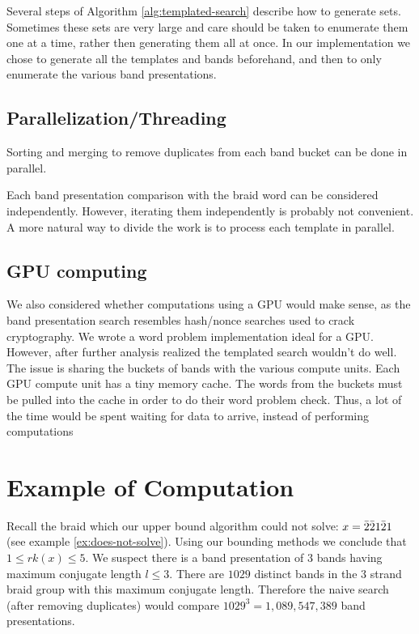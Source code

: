 \documentclass[12pt]{thesis}
\begin{document}
Several steps of Algorithm \ref{alg:templated-search} describe how to generate sets. 
Sometimes these sets are very large and care should be
taken to enumerate them one at a time, rather then generating them all at once.
In our implementation we chose to 
generate all the templates and bands beforehand,
and then to only enumerate the various band presentations.

\subsection{Parallelization/Threading}

Sorting and merging to remove duplicates from each band
bucket can be done in parallel.

Each band presentation comparison with the braid word
can be considered independently.
However, iterating them independently is probably not convenient.
A more natural way to divide the work is to process
each template in parallel.

\subsection{GPU computing}

We also considered whether computations using a GPU would make sense,
as the band presentation search resembles hash/nonce searches used to crack cryptography.
We wrote a word problem implementation ideal for a GPU.
However, after further analysis realized the templated search wouldn't do well. 
The issue is sharing the buckets of bands with the various compute units.
Each GPU compute unit has a tiny memory cache.
The words from the buckets must be pulled into the cache in order to do their word problem check.
Thus, a lot of the time would be spent waiting for data to arrive, instead of 
performing computations

\section{Example of Computation}

Recall the braid which our upper bound algorithm
could not solve: $x = \bar{2} \bar{2} 1 \bar{2} 1$ (see example \ref{ex:does-not-solve}).
Using our bounding methods we conclude that $1 \leq rk(x) \leq 5$.
We suspect there is a band presentation of $3$ bands having maximum conjugate length $l \leq 3$.
There are $1029$  distinct bands in the $3$ strand braid group with this maximum conjugate length.
Therefore the naive search (after removing duplicates)
would compare $1029^{3} = 1,089,547,389$ band presentations.
\end{document}
